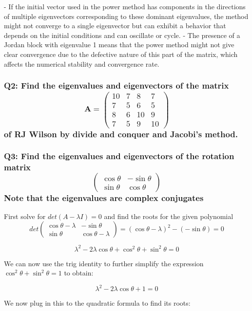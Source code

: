 \documentclass[8pt]{article}
\begin{document}
- If the initial vector used in the power method has components in the directions of multiple eigenvectors corresponding to these dominant eigenvalues, the method might not converge to a single eigenvector but can exhibit a behavior that depends on the initial conditions and can oscillate or cycle.
- The presence of a Jordan block with eigenvalue 1 means that the power method might not give clear convergence due to the defective nature of this part of the matrix, which affects the numerical stability and convergence rate.

\subsubsection*{Q2: Find the eigenvalues and eigenvectors of the matrix
\[
\mathbf{A} = 
\begin{pmatrix}
10 & 7 & 8 & 7 \\
7 & 5 & 6 & 5 \\
8 & 6 & 10 & 9 \\
7 & 5 & 9 & 10 
\end{pmatrix}
\]
of RJ Wilson by divide and conquer and Jacobi’s method.}

\subsubsection*{Q3: Find the eigenvalues and eigenvectors of the rotation matrix
$$
\begin{pmatrix}
\cos \theta & -\sin \theta \\
\sin \theta & \cos \theta
\end{pmatrix}
$$
Note that the eigenvalues are complex conjugates}

First solve for $det(A- \lambda I) = 0$ and find the roots for the given polynomial
$$
det \begin{pmatrix}
\cos \theta - \lambda & -\sin \theta \\
\sin \theta & \cos \theta - \lambda
\end{pmatrix} = (\cos \theta - \lambda)^{2} - (-\sin \theta) = 0 
$$

$$
\lambda ^{2}-2 \lambda \cos \theta + \cos ^{2} \theta + \sin ^{2} \theta = 0
$$

We can now use the trig identity to further simplify the expression $ \cos ^{2} \theta + \sin ^{2} \theta = 1$ to obtain: 

$$
\lambda ^{2}-2 \lambda \cos \theta + 1 = 0
$$

We now plug in this to the quadratic formula to find its roots:
\end{document}
